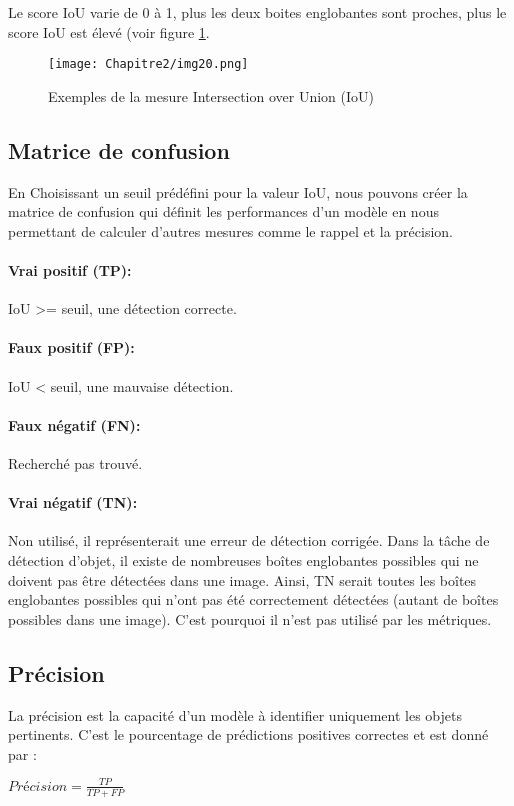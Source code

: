 Le score IoU varie de 0 à 1, plus les deux boites englobantes sont proches, plus le score IoU est élevé (voir figure \ref{img20}.
          \begin{figure}[H]
               \centering
               \texttt{[image: Chapitre2/img20.png]}
               \caption{Exemples de la mesure Intersection over Union (IoU)}
               \label{img20}
               \end{figure}

\subsection{Matrice de confusion}

En Choisissant un seuil prédéfini pour la valeur IoU, nous pouvons créer la matrice de confusion qui définit les performances d'un modèle en nous permettant de calculer d'autres mesures comme le rappel et la précision.
          \paragraph{Vrai positif (TP):} IoU >= seuil, une détection correcte. 
          \paragraph{Faux positif (FP):} IoU < seuil, une mauvaise détection.
          \paragraph{Faux négatif (FN):} Recherché pas trouvé.
          \paragraph{Vrai négatif (TN):} Non utilisé, il représenterait une erreur de détection corrigée. Dans la tâche de détection d'objet, il existe de nombreuses boîtes englobantes possibles qui ne doivent pas être détectées dans une image. Ainsi, TN serait toutes les boîtes englobantes possibles qui n'ont pas été correctement détectées (autant de boîtes possibles dans une image). C'est pourquoi il n'est pas utilisé par les métriques.

          
          \subsection{Précision}
          La précision est la capacité d'un modèle à identifier uniquement les objets pertinents. C'est le pourcentage de prédictions positives correctes et est donné par :
          \begin{center} $Précision = \frac{TP}{TP + FP}$ \end{center}

